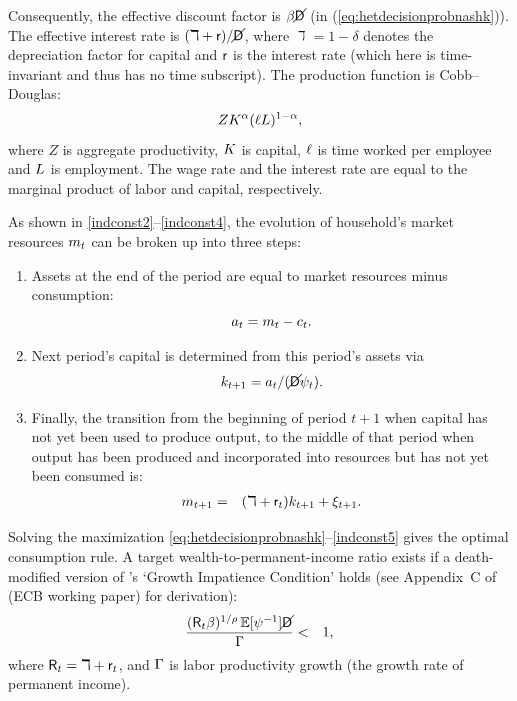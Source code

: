 \documentclass[12pt,titlepage]{econtex}
\renewcommand{\ptyLev}{\ensuremath{Z}} %
\begin{document}
Consequently, the effective discount factor is $\beta \cancel{\mathsf{D}}$ (in
(\ref{eq:hetdecisionprobnashk})). The effective interest
rate is $(\daleth +\mathsf{r})/\cancel{\mathsf{D}}$, where $\daleth =1-\delta$ denotes the depreciation factor for capital and $\mathsf{r}$ is the interest rate (which here is time-invariant and thus has no time subscript).%
The production function is Cobb--Douglas:
 \begin{equation}
\ptyLev \KLev^{\kapShare}(\labor\LLev)^{1-\kapShare},  \label{eq:outputPF}
\end{equation}
where $\ptyLev$ is aggregate productivity, $K$ is capital, $\ell$ is time worked per employee and $L$ is employment. The wage rate and the interest rate are equal to the marginal product of labor and capital, respectively.

As shown in \eqref{indconst2}--\eqref{indconst4}, the evolution of household's market resources $m_{t}$ can be broken up into three steps:
\begin{enumerate}
\item Assets at the end of the period are equal to market resources minus
consumption:
\begin{equation*}
a_{t}=m_{t}-c_{t}.
\end{equation*}
\item Next period's capital is determined from this period's assets via
\begin{equation*}
k_{t+1}=a_{t}/(\cancel{\mathsf{D}} \psi_t).
\end{equation*}
\item
Finally, the transition from the beginning of
period $t+1$ when capital has not yet been used to produce output, to the
middle of that period when output has been produced and incorporated into
resources but has not yet been consumed is:
\begin{eqnarray*}
m_{t+1} &=&(\daleth +\mathsf{r}_t)k_{t+1}+\xi_{t+1}.
\end{eqnarray*}
\end{enumerate}

Solving the maximization \eqref{eq:hetdecisionprobnashk}--\eqref{indconst5} gives the optimal consumption rule. A target wealth-to-permanent-income ratio exists if a death-modified version of \citet{BufferStockTheory}'s `Growth Impatience
Condition' holds (see Appendix~C of \citet{cstKS} (ECB working paper) for derivation):
\begin{eqnarray}
\frac{(\mathsf{R}_t\beta)^{1/\rho}\operatorname{\mathbb{E}}[\psi^{-1}]\cancel{\mathsf{D}}}{\Gamma} & < & 1, \label{eq:GIC}
\end{eqnarray}
where $\mathsf{R}_t=\daleth +\mathsf{r}_t$, and $\Gamma$ is labor productivity growth (the growth rate of permanent income).
\end{document}
